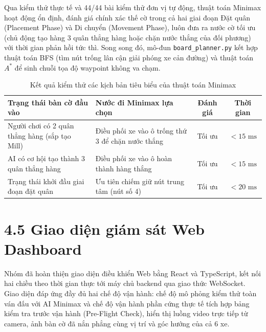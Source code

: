 \documentclass[14pt,a4paper]{extreport}
\begin{document}
Qua kiểm thử thực tế và 44/44 bài kiểm thử đơn vị tự động, thuật toán Minimax hoạt động ổn định, đánh giá chính xác thế cờ trong cả hai giai đoạn Đặt quân (Placement Phase) và Di chuyển (Movement Phase), luôn đưa ra nước cờ tối ưu (chủ động tạo hàng 3 quân thẳng hàng hoặc chặn nước thắng của đối phương) với thời gian phản hồi tức thì. Song song đó, mô-đun \texttt{board\_planner.py} kết hợp thuật toán BFS (tìm nút trống lân cận giải phóng xe cản đường) và thuật toán $A^*$ để sinh chuỗi tọa độ waypoint không va chạm.
 
\begin{table}[H]
\centering
\caption{Kết quả kiểm thử các kịch bản tiêu biểu của thuật toán Minimax}
\begin{tabular}{L{4.5cm} L{4.5cm} c c}
\toprule
\textbf{Trạng thái bàn cờ đầu vào} & \textbf{Nước đi Minimax lựa chọn} & \textbf{Đánh giá} & \textbf{Thời gian} \\
\midrule
Người chơi có 2 quân thẳng hàng (sắp tạo Mill) & Điều phối xe vào ô trống thứ 3 để chặn nước thắng & Tối ưu & $< 15\text{ ms}$ \\
AI có cơ hội tạo thành 3 quân thẳng hàng & Điều phối xe vào ô hoàn thành hàng thắng & Tối ưu & $< 15\text{ ms}$ \\
Trạng thái khởi đầu giai đoạn đặt quân & Ưu tiên chiếm giữ nút trung tâm (nút số 4) & Tối ưu & $< 20\text{ ms}$ \\
\bottomrule
\end{tabular}
\end{table}
 
\section*{4.5 Giao diện giám sát Web Dashboard}
Nhóm đã hoàn thiện giao diện điều khiển Web bằng React và TypeScript, kết nối hai chiều theo thời gian thực tới máy chủ backend qua giao thức WebSocket. Giao diện đáp ứng đầy đủ hai chế độ vận hành: chế độ mô phỏng kiểm thử toàn ván đấu với AI Minimax và chế độ vận hành phần cứng thực tế tích hợp bảng kiểm tra trước vận hành (Pre-Flight Check), hiển thị luồng video trực tiếp từ camera, ảnh bàn cờ đã nắn phẳng cùng vị trí và góc hướng của cả 6 xe.
 
\end{document}
